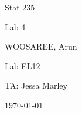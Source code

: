 \documentclass[letterpaper]{article}
\begin{document}
\begin{titlepage}
 \begin{center}
  \vspace*{1cm}
  \Huge
  Stat 235
  \vspace{1cm}
  
  Lab 4
  \vspace{1cm}
  
  WOOSAREE, Arun
  \vspace{1cm}
  
  \Huge
  Lab EL12
  \vspace{1cm}
  
  TA: Jessa Marley
  \vspace{1cm}
  
  \today
  \vfill
 \end{center}
\end{titlepage}

\section{}%

\subsection{}%

\subsection{}%

\section{}%

\subsection{}%

\subsection{}%

\section{}%
\end{document}
